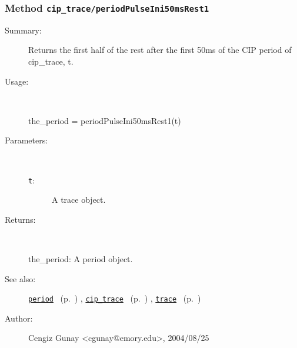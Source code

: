 \subsubsection[Method \texttt{periodPulseIni50msRest1}]{Method \texttt{cip\_trace/periodPulseIni50msRest1}}%
%
\label{ref_cip_trace__periodPulseIni50msRest1}%
\hypertarget{ref_cip_trace__periodPulseIni50msRest1}{}%
\begin{description}
\item[Summary:]Returns the first half of the rest after the 
			first 50ms of the CIP period of cip\_trace, t. 
%
\item[Usage:]~%
\begin{lyxcode}%
the\_period = periodPulseIni50msRest1(t)
%
\end{lyxcode}%
%
%
\item[Parameters:]~
\begin{description}%
\item[\texttt{t}:]
 A trace object.
\end{description}%
%
\item[Returns:
]~

	the\_period: A period object.
%
%
\item[See also:]%
\hyperlink{ref_period}{\texttt{period}}%
\ (p.~\pageref{ref_period})%
%
, \hyperlink{ref_cip_trace}{\texttt{cip\_trace}}%
\ (p.~\pageref{ref_cip_trace})%
%
, \hyperlink{ref_trace}{\texttt{trace}}%
\ (p.~\pageref{ref_trace})%
%
%
\item[Author:]%
Cengiz Gunay <cgunay@emory.edu>, 2004/08/25
%
\end{description}
\methodline%
